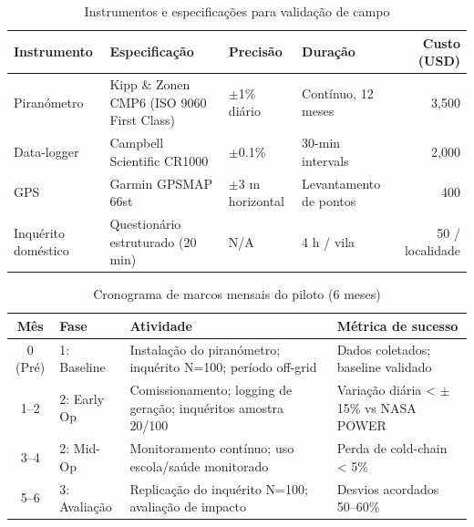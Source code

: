 \documentclass[12pt, a4paper]{article}
\begin{document}
\begin{table}[H]
\centering
\caption{Instrumentos e especificações para validação de campo}
\label{tab:validation_instruments}
\footnotesize
\begin{tabular}{@{}p{3.5cm}p{5cm}p{2.5cm}p{2.5cm}r@{}}
\toprule
\textbf{Instrumento} & \textbf{Especificação} & \textbf{Precisão} & \textbf{Duração} & \textbf{Custo (USD)} \\
\midrule
Piranómetro & Kipp \& Zonen CMP6 (ISO 9060 First Class) & $\pm$1\% diário & Contínuo, 12 meses & 3,500 \\
Data-logger & Campbell Scientific CR1000 & $\pm$0.1\% & 30-min intervals & 2,000 \\
GPS & Garmin GPSMAP 66st & $\pm$3 m horizontal & Levantamento de pontos & 400 \\
Inquérito doméstico & Questionário estruturado (20 min) & N/A & 4 h / vila & 50 / localidade \\
\bottomrule
\end{tabular}
\end{table}

\begin{table}[H]
\centering
\caption{Cronograma de marcos mensais do piloto (6 meses)}
\label{tab:validation_timeline}
\begin{tabular}{|c|l|p{7cm}|p{3.5cm}|}
\hline
\textbf{Mês} & \textbf{Fase} & \textbf{Atividade} & \textbf{Métrica de sucesso} \\
\hline
0 (Pré) & 1: Baseline & Instalação do piranómetro; inquérito N=100; período off-grid & Dados coletados; baseline validado \\
\hline
1--2 & 2: Early Op & Comissionamento; logging de geração; inquéritos amostra 20/100 & Variação diária < $\pm$15\% vs NASA POWER \\
\hline
3--4 & 2: Mid-Op & Monitoramento contínuo; uso escola/saúde monitorado & Perda de cold-chain < 5\% \\
\hline
5--6 & 3: Avaliação & Replicação do inquérito N=100; avaliação de impacto & Desvios acordados 50--60\% \\
\hline
\end{tabular}
\end{table}
\end{document}
